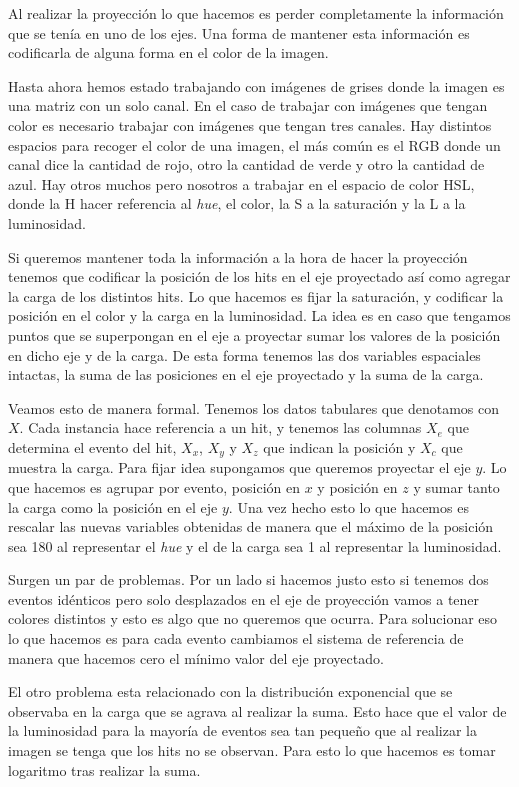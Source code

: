 \documentclass[a4paper,12pt,twoside,titlepage]{article}
\begin{document}
Al realizar la proyección lo que hacemos es perder completamente la información que se tenía en uno de los ejes. Una forma de mantener esta información es codificarla de alguna forma en el color de la imagen.

Hasta ahora hemos estado trabajando con imágenes de grises donde la imagen es una matriz con un solo canal. En el caso de trabajar con imágenes que tengan color es necesario trabajar con imágenes que tengan tres canales. Hay distintos espacios para recoger el color de una imagen, el más común es el RGB donde un canal dice la cantidad de rojo, otro la cantidad de verde y otro la cantidad de azul. Hay otros muchos pero nosotros a trabajar en el espacio de color HSL, donde la H hacer referencia al \textit{hue}, el color, la S a la saturación y la L a la luminosidad. 

Si queremos mantener toda la información a la hora de hacer la proyección tenemos que codificar la posición de los hits en el eje proyectado así como agregar la carga de los distintos hits. Lo que hacemos es fijar la saturación, y codificar la posición en el color y la carga en la luminosidad. La idea es en caso que tengamos puntos que se superpongan en el eje a proyectar sumar los valores de la posición en dicho eje y de la carga. De esta forma tenemos las dos variables espaciales intactas, la suma de las posiciones en el eje proyectado y la suma de la carga.

Veamos esto de manera formal. Tenemos los datos tabulares que denotamos con $X$. Cada instancia hace referencia a un hit, y tenemos las columnas $X_e$ que determina el evento del hit, $X_x$, $X_y$ y $X_z$ que indican la posición y $X_c$ que muestra la carga. Para fijar idea supongamos que queremos proyectar el eje $y$. Lo que hacemos es agrupar por evento, posición en $x$ y posición en $z$ y sumar tanto la carga como la posición en el eje $y$. Una vez hecho esto lo que hacemos es rescalar las nuevas variables obtenidas de manera que el máximo de la posición sea 180 al representar el \textit{hue} y el de la carga sea 1 al representar la luminosidad.

Surgen un par de problemas. Por un lado si hacemos justo esto si tenemos dos eventos idénticos pero solo desplazados en el eje de proyección vamos a tener colores distintos y esto es algo que no queremos que ocurra. Para solucionar eso lo que hacemos es para cada evento cambiamos el sistema de referencia de manera que hacemos cero el mínimo valor del eje proyectado. 

El otro problema esta relacionado con la distribución exponencial que se observaba en la carga que se agrava al realizar la suma. Esto hace que el valor de la luminosidad para la mayoría de eventos sea tan pequeño que al realizar la imagen se tenga que los hits no se observan. Para esto lo que hacemos es tomar logaritmo tras realizar la suma.
\end{document}
